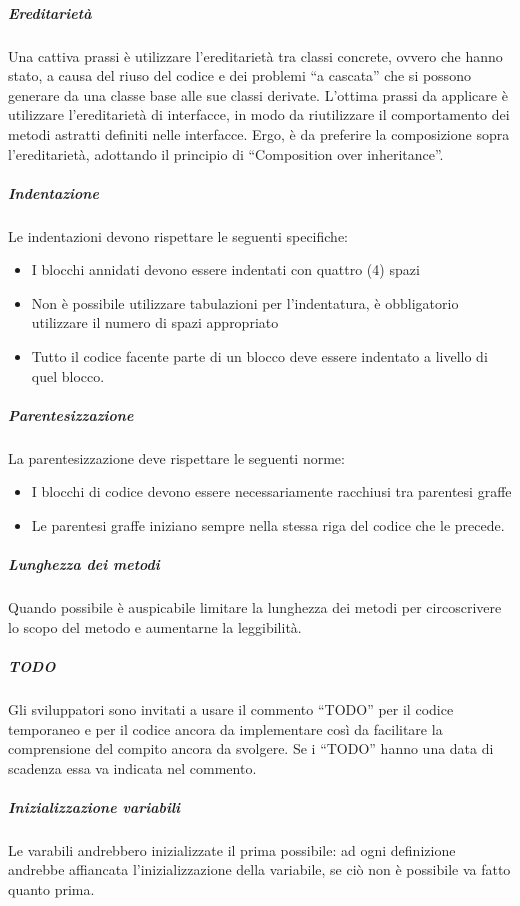 \documentclass[../../norme-di-progetto.tex]{subfiles}
\begin{document}
\subparagraph{Ereditarietà}%
\label{subp:ereditarieta}
Una cattiva prassi è utilizzare l’ereditarietà tra classi concrete, ovvero che hanno stato, a causa del riuso del codice e dei problemi ``a cascata'' che si possono generare da una classe base alle sue classi derivate.
L'ottima prassi da applicare è utilizzare l'ereditarietà di interfacce, in modo da riutilizzare il comportamento dei metodi astratti definiti nelle interfacce.
Ergo, è da preferire la composizione sopra l'ereditarietà, adottando il principio di “Composition over inheritance”.

\subparagraph{Indentazione}%
\label{subp:indentazione}
Le indentazioni devono rispettare le seguenti specifiche:
\begin{itemize}
  \item I blocchi annidati devono essere indentati con quattro (4) spazi
  \item Non è possibile utilizzare tabulazioni per l'indentatura, è obbligatorio utilizzare il numero di spazi appropriato
  \item Tutto il codice facente parte di un blocco deve essere indentato a livello di quel blocco.
\end{itemize}

\subparagraph{Parentesizzazione}%
\label{subp:parentesizzazione}
La parentesizzazione deve rispettare le seguenti norme:
\begin{itemize}
  \item I blocchi di codice devono essere necessariamente racchiusi tra parentesi graffe
  \item Le parentesi graffe iniziano sempre nella stessa riga del codice che le precede.
\end{itemize}

\subparagraph{Lunghezza dei metodi}%
\label{subp:lunghezza_metodi}
Quando possibile è auspicabile limitare la lunghezza dei metodi per circoscrivere lo scopo del metodo e aumentarne la leggibilità.

\subparagraph{TODO}%
\label{subp:TODO}
Gli sviluppatori sono invitati a usare il commento ``TODO'' per il codice temporaneo e per il codice ancora da implementare così da facilitare la comprensione del compito ancora da svolgere.
Se i ``TODO'' hanno una data di scadenza essa va indicata nel commento.

\subparagraph{Inizializzazione variabili}%
\label{subp:inizializzazione_variabili}
Le varabili andrebbero inizializzate il prima possibile: ad ogni definizione andrebbe affiancata l'inizializzazione della variabile, se ciò non è possibile va fatto quanto prima.
\end{document}
